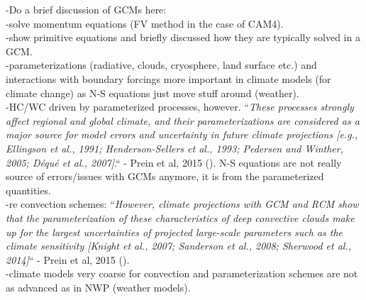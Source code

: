 \documentclass[letterpaper,12pt,titlepage,oneside,final]{book}
\begin{document}
-Do a brief discussion of GCMs here:
\\
-solve momentum equations (FV method in the case of CAM4).
\\
-show primitive equations and briefly discussed how they are typically solved in a GCM.
\\
-parameterizations (radiative, clouds, cryosphere, land surface etc.) and interactions with boundary forcings more important in climate models (for climate change) as N-S equations just move stuff around (weather). 
\\
-HC/WC driven by parameterized processes, however. ``\textit{These processes strongly affect regional and global climate, and their parameterizations are considered as a major source for model errors and uncertainty in future climate projections [e.g., Ellingson et al., 1991; Henderson-Sellers et al., 1993; Pedersen and Winther, 2005; Déqué et al., 2007]}.`` - Prein et al, 2015 (\citep{prein_review_2015}). N-S equations are not really source of errors/issues with GCMs anymore, it is from the parameterized quantities.
\\
-re convection schemes: ``\textit{However, climate projections with GCM and RCM show that the parameterization of these characteristics of deep convective clouds make up for the largest uncertainties of projected large-scale parameters such as the climate sensitivity [Knight et al., 2007; Sanderson et al., 2008; Sherwood et al., 2014]}`` - Prein et al, 2015 (\citep{prein_review_2015}).
\\
-climate models very coarse for convection and parameterization schemes are not as advanced as in NWP (weather models).
\\
\end{document}
